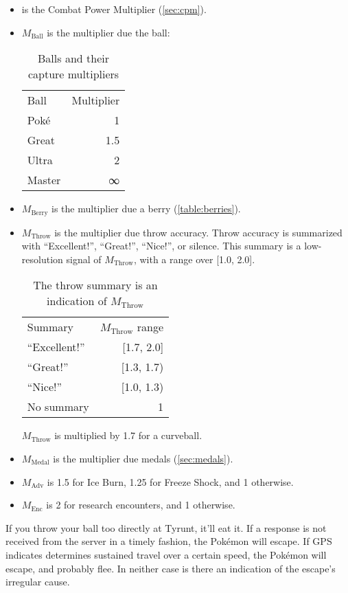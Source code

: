 \begin{itemize}
  \item \CPM{} is the Combat Power Multiplier (\autoref{sec:cpm}).
  \item $M_\mathrm{Ball}$ is the multiplier due the ball:
\begin{table}[h!]
\centering
\begin{tabular}{lr}
Ball & Multiplier\\
\Midrule
Poké & 1\\
Great & 1.5\\
Ultra & 2\\
Master & ∞\\
\end{tabular}
  \caption{Balls and their capture multipliers\label{table:balls}}
\end{table}
\item $M_\mathrm{Berry}$ is the multiplier due a berry (\autoref{table:berries}).
\item $M_\mathrm{Throw}$ is the multiplier due throw accuracy. Throw accuracy is summarized
   with ``Excellent!'', ``Great!'', ``Nice!'', or silence.
    This summary is a low-resolution signal of $M_\mathrm{Throw}$, with a range over [1.0, 2.0].
\begin{table}[h!]
\centering
\begin{tabular}{lr}
Summary & $M_\mathrm{Throw}$ range\\
\Midrule
``Excellent!'' & [1.7, 2.0]\\
``Great!'' & [1.3, 1.7)\\
``Nice!'' & [1.0, 1.3)\\
No summary & 1\\
\end{tabular}
  \caption{The throw summary is an indication of $M_\mathrm{Throw}$\label{table:throw}}
\end{table}
$M_\mathrm{Throw}$ is multiplied by 1.7 for a curveball.
\item $M_\mathrm{Medal}$ is the multiplier due medals (\autoref{sec:medals}).
\item $M_\mathrm{Adv}$ is 1.5 for Ice Burn, 1.25 for Freeze Shock, and 1 otherwise.
\item $M_\mathrm{Enc}$ is 2 for research encounters, and 1 otherwise.
\end{itemize}
If you throw your ball too directly at Tyrunt, it'll eat it.
If a response is not received from the server in a timely fashion, the Pokémon will escape.
If GPS indicates determines sustained travel over a certain speed, the Pokémon will escape, and probably flee.
In neither case is there an indication of the escape's irregular cause.

